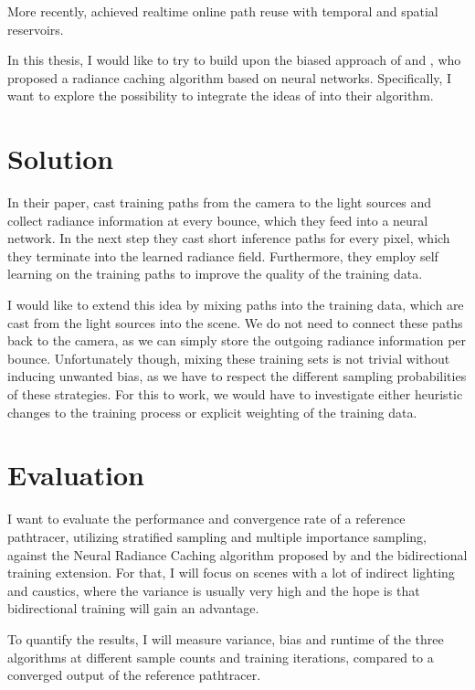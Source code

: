 More recently, \textcite{ouyang2021} achieved realtime online path reuse with temporal and spatial reservoirs.


In this thesis, I would like to try to build upon the biased approach of \textcite{muller2021} and \textcite{muller2022}, who proposed a radiance caching algorithm based on neural networks.
Specifically, I want to explore the possibility to integrate the ideas of \cite{arvo1986} into their algorithm.

\section{Solution}

In their paper, \textcite{muller2021} cast training paths from the camera to the light sources and collect radiance information at every bounce, which they feed into a neural network.
In the next step they cast short inference paths for every pixel, which they terminate into the learned radiance field.
Furthermore, they employ self learning on the training paths to improve the quality of the training data.


I would like to extend this idea by mixing paths into the training data, which are cast from the light sources into the scene.
We do not need to connect these paths back to the camera, as we can simply store the outgoing radiance information per bounce.
Unfortunately though, mixing these training sets is not trivial without inducing unwanted bias, as we have to respect the different sampling probabilities of these strategies.
For this to work, we would have to investigate either heuristic changes to the training process or explicit weighting of the training data.

\section{Evaluation}

I want to evaluate the performance and convergence rate of a reference pathtracer, utilizing stratified sampling and multiple importance sampling, against the Neural Radiance Caching algorithm proposed by \textcite{muller2021} and the bidirectional training extension.
For that, I will focus on scenes with a lot of indirect lighting and caustics, where the variance is usually very high and the hope is that bidirectional training will gain an advantage.

To quantify the results, I will measure variance, bias and runtime of the three algorithms at different sample counts and training iterations, compared to a converged output of the reference pathtracer.

